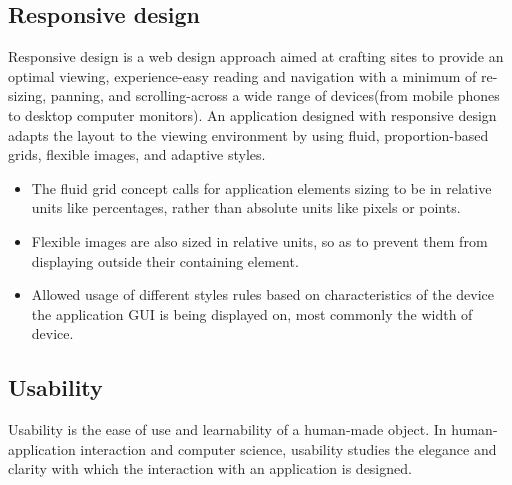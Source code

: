 \subsection {Responsive design}
	Responsive design \cite{ wiki:RWD, CSS3} is a web design approach aimed at crafting sites to provide an optimal viewing, experience-easy reading and navigation with a minimum of re-sizing, panning, and scrolling-across a wide range of devices(from mobile phones to desktop computer monitors). An application designed with responsive design\cite{pettit, ethan} adapts the layout to the viewing environment by using fluid, proportion-based grids, flexible images, and adaptive styles.
    \begin{itemize}
	\item The fluid grid concept calls for application elements sizing to be in relative units like percentages, rather than absolute units like pixels or points. 
	\item Flexible images are also sized in relative units, so as to prevent them from displaying outside their containing element. 
	\item Allowed usage of different styles rules based on characteristics of the device the application GUI is being displayed on, most commonly the width of device. 
	\end{itemize}

\subsection {Usability}
     Usability is the ease of use and learnability of a human-made object. In human-application interaction and computer science, usability studies the elegance and clarity with which the interaction with an application is designed.

